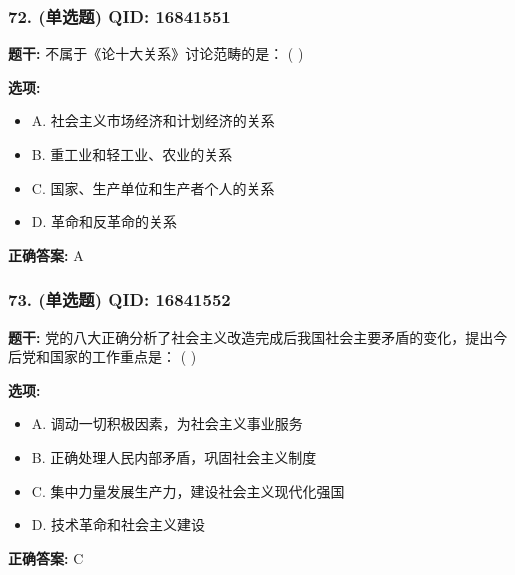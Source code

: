 \documentclass[12pt,UTF8]{ctexart}
\begin{document}
\subsubsection*{72. (单选题) \small QID: 16841551}

\textbf{题干:}
不属于《论十大关系》讨论范畴的是： ( )

\textbf{选项:}
\begin{itemize}[leftmargin=*]

  \item A. 社会主义市场经济和计划经济的关系

  \item B. 重工业和轻工业、农业的关系

  \item C. 国家、生产单位和生产者个人的关系

  \item D. 革命和反革命的关系

\end{itemize}

\textbf{正确答案:}
A

\vspace{0.3em}\hrulefill\vspace{0.7em}

\subsubsection*{73. (单选题) \small QID: 16841552}

\textbf{题干:}
党的八大正确分析了社会主义改造完成后我国社会主要矛盾的变化，提出今后党和国家的工作重点是： ( )

\textbf{选项:}
\begin{itemize}[leftmargin=*]

  \item A. 调动一切积极因素，为社会主义事业服务

  \item B. 正确处理人民内部矛盾，巩固社会主义制度

  \item C. 集中力量发展生产力，建设社会主义现代化强国

  \item D. 技术革命和社会主义建设

\end{itemize}

\textbf{正确答案:}
C

\vspace{0.3em}\hrulefill\vspace{0.7em}
\end{document}
